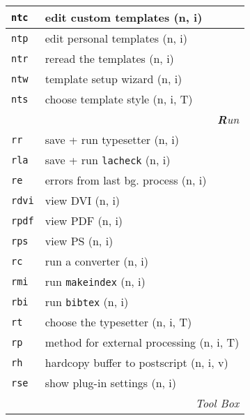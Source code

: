 \documentclass[oneside,10pt,landscape,DIV16]{scrartcl}
\newcommand{\Map}[1] {\textbf{\textasciiacute}\texttt{#1}}
\begin{document}
\begin{multicols}{3}
\begin{center}
\begin{tabular}[]{|p{11mm}|p{62mm}|}
\hline \Map{ntc} & edit custom templates     \hfill (n, i)   \\
\hline \Map{ntp} & edit personal templates   \hfill (n, i)   \\
\hline \Map{ntr} & reread the templates      \hfill (n, i)   \\
\hline \Map{ntw} & template setup wizard     \hfill (n, i)   \\
\hline \Map{nts} & choose template style     \hfill (n, i, T)\\
\hline
\hline
\multicolumn{2}{|r|}{\textsl{\textbf{R}un}} \\[1.0ex]
\hline \Map{rr}   & save + run typesetter                    \hfill (n, i)\\
\hline \Map{rla}  & save + run \texttt{lacheck}              \hfill (n, i)\\
\hline \Map{re}   & errors from last bg. process             \hfill (n, i)\\
\hline \Map{rdvi} & view DVI                                 \hfill (n, i)\\
\hline \Map{rpdf} & view PDF                                 \hfill (n, i)\\
\hline \Map{rps}  & view PS                                  \hfill (n, i)\\
\hline \Map{rc}   & run a converter                          \hfill (n, i)\\
\hline
\hline \Map{rmi}  & run \texttt{makeindex}                   \hfill (n, i)\\
\hline \Map{rbi}  & run \texttt{bibtex}                      \hfill (n, i)\\
\hline
\hline \Map{rt}   & choose the typesetter                    \hfill (n, i, T)\\
\hline \Map{rp}   & method for external processing           \hfill (n, i, T)\\
\hline
\hline \Map{rh}   & hardcopy buffer to postscript            \hfill (n, i, v)\\
\hline \Map{rse}  & show plug-in settings                    \hfill (n, i)\\
\hline
\hline
\multicolumn{2}{|r|}{\textsl{Tool Box}} \\[1.0ex]

\end{tabular}
\end{center}
\end{multicols}
\end{document}
